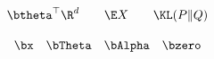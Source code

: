 \documentclass{article}
\begin{document}
\[
  \btheta^\top \R^d
  \qquad
  \E X
  \qquad
  \KL(P \Vert Q)
\]

\[
  \bx \quad \bTheta \quad \bAlpha \quad \bzero
\]
\end{document}
